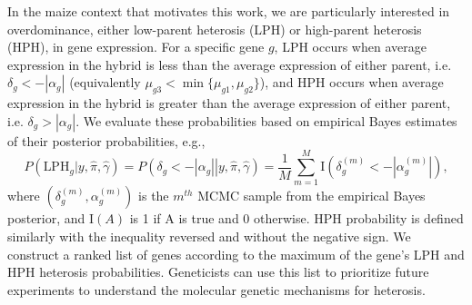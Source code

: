 \documentclass[useAMS,usenatbib,referee]{biom}
\begin{document}
In the maize context that motivates this work, we are particularly interested in overdominance, either low-parent heterosis (LPH) or high-parent heterosis (HPH), in gene expression. 
For a specific gene $g$, LPH occurs when average expression in the hybrid is less than the average expression of either parent, i.e. $\delta_g < -|\alpha_g|$ (equivalently $\mu_{g3} < \min\{\mu_{g1},\mu_{g2}\}$), and HPH occurs when average expression in the hybrid is greater than the average expression of either parent, i.e. $\delta_g > |\alpha_g|$. 
We evaluate these probabilities based on empirical Bayes estimates of their posterior probabilities, e.g., 
\begin{equation}
P(\mbox{LPH}_g|y,\hat{\pi},\hat{\gamma}) = 
P\left(\left.\delta_g < -|\alpha_g|\right|y, \hat{\pi},\hat{\gamma}\right) = \frac{1}{M} \sum_{m=1}^M \mathrm{I}\left(\delta_g^{(m)} < -\left|\alpha_g^{(m)}\right|\right), 
\label{e:probs}
\end{equation}
where $\left(\delta_g^{(m)},\alpha_g^{(m)}\right)$ is the $m^{th}$ MCMC sample from the empirical Bayes posterior, and $\mathrm{I}(A)$ is 1 if A is true and 0 otherwise. HPH probability is defined similarly with the inequality reversed and without the negative sign. We construct a ranked list of genes according to the maximum of the gene's LPH and HPH heterosis probabilities. Geneticists can use this list to prioritize future experiments to understand the molecular genetic mechanisms for heterosis.  
\end{document}
